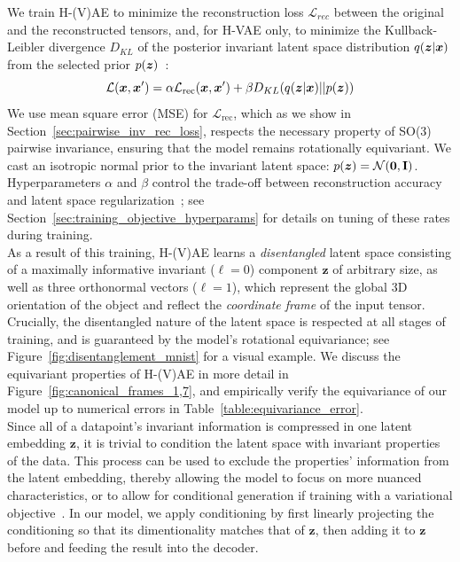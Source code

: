 We train H-(V)AE to minimize the reconstruction loss $\mathcal{L}_{rec}$ between the original and
the reconstructed tensors, and, for H-VAE only, to minimize the Kullback-Leibler divergence 
$D_{KL}$ of the posterior invariant latent space distribution $q({\bm{z}}|{\bm{x}})$ from the selected prior
$p({\bm{z}})$~\cite{kingma_auto-encoding_2013}:
\begin{equation}
    \mathcal{L}({\bm{x}}, {\bm{x}}') = \alpha \mathcal{L}_{\text{rec}}({\bm{x}}, {\bm{x}}') + \beta D_{KL}(q({\bm{z}}|{\bm{x}}) || p({\bm{z}}))
    \label{eqn:training_objective}
\end{equation}
We use mean square error (MSE) for $\mathcal{L}_{\text{rec}}$, which as we show in
Section~\ref{sec:pairwise_inv_rec_loss}, respects the necessary property of SO(3) pairwise
invariance, ensuring that the model remains rotationally equivariant. We cast an isotropic normal
prior to the invariant latent space: $p({\bm{z}}) = \mathcal{N}(\bf 0, {\bm{I}})$. Hyperparameters $\alpha$
and $\beta$ control the trade-off between reconstruction accuracy and latent space
regularization~\cite{higgins_beta-vae_2022}; see Section~\ref{sec:training_objective_hyperparams}
for details on tuning of these rates during training.\\



As a result of this training, H-(V)AE learns a \textit{disentangled} latent space consisting of a
maximally informative invariant ($\ell = 0$) component $\mathbf{z}$ of arbitrary size, as well as
three orthonormal vectors ($\ell = 1$), which represent the global 3D orientation of the object and
reflect the {\em coordinate frame} of the input tensor. Crucially, the disentangled nature of the
latent space is respected at all stages of training, and is guaranteed by the model's rotational
equivariance; see Figure~\ref{fig:disentanglement_mnist} for a visual example. We discuss the
equivariant properties of H-(V)AE in more detail in Figure~\ref{fig:canonical_frames_1,7}, and
empirically verify the equivariance of our model up to numerical errors in
Table~\ref{table:equivariance_error}.\\

Since all of a datapoint's invariant information is compressed in one latent embedding
$\mathbf{z}$, it is trivial to condition the latent space with invariant properties of the data.
This process can be used to exclude the properties' information from the latent embedding, thereby
allowing the model to focus on more nuanced characteristics, or to allow for conditional generation
if training with a variational objective~\citep{sohn_learning_2015}. In our model, we apply
conditioning by first linearly projecting the conditioning so that its dimentionality matches that
of $\mathbf{z}$, then adding it to $\mathbf{z}$ before and feeding the result into the decoder.


